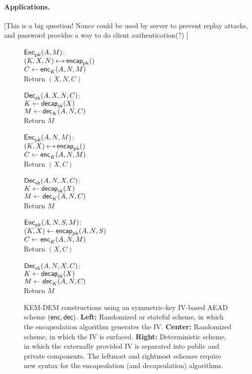 \paragraph{Applications. } [This is a big question! Nonce could be used by server to prevent replay attacks, and password provides a way to do client authentication(?)  ]
\begin{figure}
\begin{center}
{
\underline{${\mathsf{Enc}}_{\mathrm{pk}}^{}(A, M)$}:\\[2pt]
$(K,X,\pubiv) \getsr \encap_\pk()$\\
$C \gets {\mathsf{enc}}_{K}^{}(A,N,M)$\\
Return $(X,N,C)$

\medskip
\underline{${\mathsf{Dec}}_{\mathrm{sk}}^{}(A,X,N,C)$}:\\[2pt]
$K \gets \mathsf{decap}_{\mathrm{sk}}(X)$\\
$M \gets {\mathsf{dec}}_{K}^{}(A,N,C)$\\
Return $M$
}
{
\underline{${\mathsf{Enc}}_{\mathrm{pk}}^{}(A,N,M)$}:\\[2pt]
$(K,X) \getsr \encap_\pk()$\\
$C \gets {\mathsf{enc}}_{K}^{}(A,N,M)$\\
Return $(X,C)$

\medskip
\underline{${\mathsf{Dec}}_{\mathrm{sk}}^{}(A,N,X,C)$}:\\[2pt]
$K \gets \mathsf{decap}_{\mathrm{sk}}(X)$\\
$M \gets {\mathsf{dec}}_{K}^{}(A,N,C)$\\
Return $M$

}
{
\underline{${\mathsf{Enc}}_{\mathrm{pk}}^{}(A,N,S,M)$}:\\[2pt]
$(K,X) \gets \mathsf{encap}_{\mathrm{pk}}(A,N,S)$\\
$C \gets {\mathsf{enc}}_{K}^{}(A,N,M)$\\
Return $(X,C)$

\medskip
\underline{${\mathsf{Dec}}_{\mathrm{sk}}^{}(A,N,X,C)$}:\\[2pt]
$K \gets \mathsf{decap}_{\mathrm{sk}}(X)$\\
$M \gets {\mathsf{dec}}_{K}^{}(A,N,C)$\\
Return $M$
}
\caption{KEM-DEM constructions using an symmetric-key IV-based AEAD scheme $({\mathsf{enc}},{\mathsf{dec}})$. \textbf{Left:} Randomized or stateful scheme, in which the encapsulation algorithm generates the IV.  \textbf{Center:} Randomized scheme, in which the IV is surfaced.  \textbf{Right:} Deterministic scheme, in which the externally provided IV is separated into public and private components. The leftmost and rightmost schemes require new syntax for the encapsulation (and decapsulation) algorithms.}
\label{fig:kem-dem options}
\end{center}
\end{figure}

